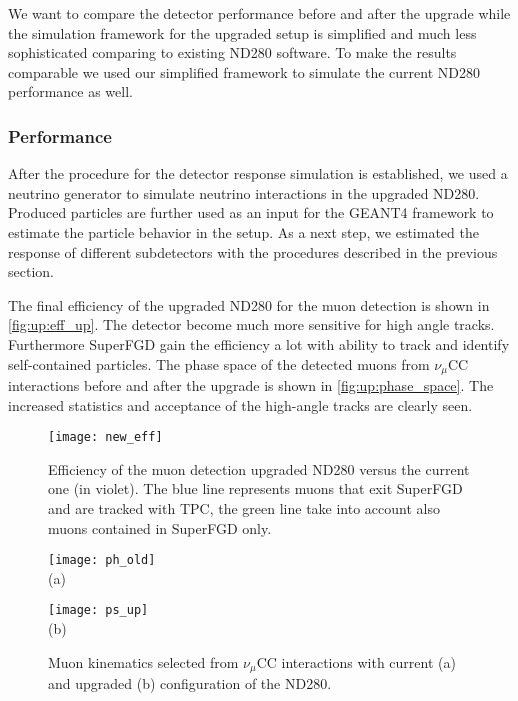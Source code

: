 \documentclass[main.tex]{subfiles}
\begin{document}
We want to compare the detector performance before and after the upgrade while the simulation framework for the upgraded setup is simplified and much less sophisticated comparing to existing ND280 software. To make the results comparable we used our simplified framework to simulate the current ND280 performance as well.

\subsubsection{Performance}
After the procedure for the detector response simulation is established, we used a neutrino generator to simulate neutrino interactions in the upgraded ND280. Produced particles are further used as an input for the GEANT4 framework to estimate the particle behavior in the setup. As a next step, we estimated the response of different subdetectors with the procedures described in the previous section.

The final efficiency of the upgraded ND280 for the muon detection is shown in \autoref{fig:up:eff_up}. The detector become much more sensitive for high angle tracks. Furthermore SuperFGD gain the efficiency a lot with ability to track and identify self-contained particles. The phase space of the detected muons from $\nu_\mu$CC interactions before and after the upgrade is shown in \autoref{fig:up:phase_space}. The increased statistics and acceptance of the high-angle tracks are clearly seen.

\begin{figure}[!ht]
  \centering
  \texttt{[image: new\_eff]}
  \caption{Efficiency of the muon detection upgraded ND280 versus the current one (in violet). The blue line represents muons that exit SuperFGD and are tracked with TPC, the green line take into account also muons contained in SuperFGD only.}
  \label{fig:up:eff_up}
\end{figure}

\begin{figure}[!ht]
  \centering
  \begin{minipage}{0.49\linewidth}
    \centering
    \texttt{[image: ph\_old]} \\ (a)
  \end{minipage}
  \begin{minipage}{0.49\linewidth}
    \centering
    \texttt{[image: ps\_up]} \\ (b)
  \end{minipage}
    \caption{Muon kinematics selected from $\nu_\mu$CC interactions with current (a) and upgraded (b) configuration of the ND280.}
    \label{fig:up:phase_space}
\end{figure}
\end{document}
